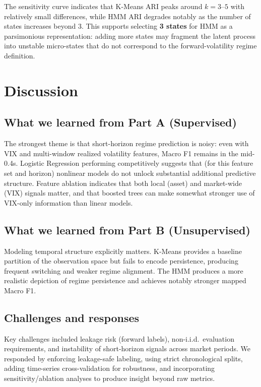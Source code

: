 \documentclass[11pt]{article}
\begin{document}
The sensitivity curve indicates that K-Means ARI peaks around $k=3$--$5$ with relatively small differences, while HMM ARI degrades notably as the number of states increases beyond 3. This supports selecting \textbf{3 states} for HMM as a parsimonious representation: adding more states may fragment the latent process into unstable micro-states that do not correspond to the forward-volatility regime definition.

\newpage
\section{Discussion}
\subsection{What we learned from Part A (Supervised)}
The strongest theme is that short-horizon regime prediction is noisy: even with VIX and multi-window realized volatility features, Macro F1 remains in the mid-0.4s. Logistic Regression performing competitively suggests that (for this feature set and horizon) nonlinear models do not unlock substantial additional predictive structure. Feature ablation indicates that both local (asset) and market-wide (VIX) signals matter, and that boosted trees can make somewhat stronger use of VIX-only information than linear models.

\subsection{What we learned from Part B (Unsupervised)}
Modeling temporal structure explicitly matters. K-Means provides a baseline partition of the observation space but fails to encode persistence, producing frequent switching and weaker regime alignment. The HMM produces a more realistic depiction of regime persistence and achieves notably stronger mapped Macro F1.

\subsection{Challenges and responses}
Key challenges included leakage risk (forward labels), non-i.i.d.\ evaluation requirements, and instability of short-horizon signals across market periods. We responded by enforcing leakage-safe labeling, using strict chronological splits, adding time-series cross-validation for robustness, and incorporating sensitivity/ablation analyses to produce insight beyond raw metrics.
\end{document}
